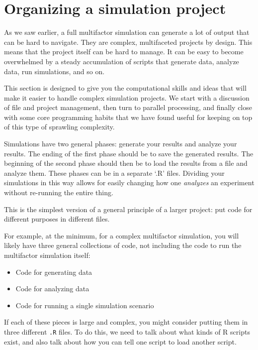 \documentclass[
]{book}
\providecommand{\tightlist}{%
  \setlength{\itemsep}{0pt}\setlength{\parskip}{0pt}}
\begin{document}
\chapter{Organizing a simulation project}\label{organizing-a-simulation-project}

As we saw earlier, a full multifactor simulation can generate a lot of output that can be hard to navigate.
They are complex, multifaceted projects by design.
This means that the project itself can be hard to manage.
It can be easy to become overwhelmed by a steady accumulation of scripts that generate data, analyze data, run simulations, and so on.

This section is designed to give you the computational skills and ideas that will make it easier to handle complex simulation projects.
We start with a discussion of file and project management, then turn to parallel processing, and finally close with some core programming habits that we have found useful for keeping on top of this type of sprawling complexity.

Simulations have two general phases: generate your results and analyze your results.
The ending of the first phase should be to save the generated results.
The beginning of the second phase should then be to load the results from a file and analyze them.
These phases can be in a separate `.R' files.
Dividing your simulations in this way allows for easily changing how one \emph{analyzes} an experiment without re-running the entire thing.

This is the simplest version of a general principle of a larger project: put code for different purposes in different files.

For example, at the minimum, for a complex multifactor simulation, you will likely have three general collections of code, not including the code to run the multifactor simulation itself:

\begin{itemize}
\tightlist
\item
  Code for generating data
\item
  Code for analyzing data
\item
  Code for running a single simulation scenario
\end{itemize}

If each of these pieces is large and complex, you might consider putting them in three different \texttt{.R} files.
To do this, we need to talk about what kinds of R scripts exist, and also talk about how you can tell one script to load another script.
\end{document}
